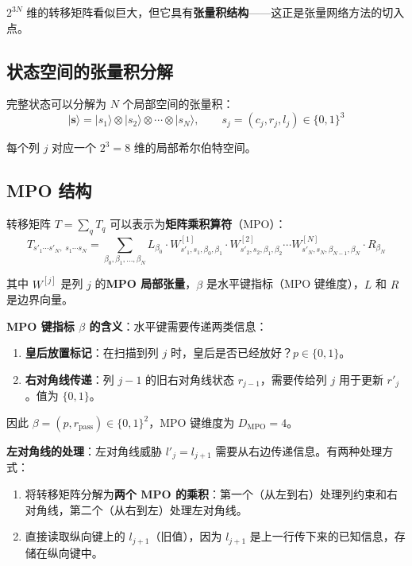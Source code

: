 \documentclass[12pt,a4paper]{ctexart}
\begin{document}
$2^{3N}$ 维的转移矩阵看似巨大，但它具有\textbf{张量积结构}——这正是张量网络方法的切入点。

\subsection{状态空间的张量积分解}

完整状态可以分解为 $N$ 个局部空间的张量积：
\begin{equation}
|\mathbf{s}\rangle = |s_1\rangle \otimes |s_2\rangle \otimes \cdots \otimes |s_N\rangle, \qquad s_j = (c_j, r_j, l_j) \in \{0,1\}^3
\end{equation}

每个列 $j$ 对应一个 $2^3 = 8$ 维的局部希尔伯特空间。

\subsection{MPO 结构}

转移矩阵 $T = \sum_q T_q$ 可以表示为\textbf{矩阵乘积算符}（MPO）：
\begin{equation}
T_{s'_1 \cdots s'_N,\; s_1 \cdots s_N} = \sum_{\beta_0, \beta_1, \ldots, \beta_N} L_{\beta_0} \cdot W^{[1]}_{s'_1, s_1, \beta_0, \beta_1} \cdot W^{[2]}_{s'_2, s_2, \beta_1, \beta_2} \cdots W^{[N]}_{s'_N, s_N, \beta_{N-1}, \beta_N} \cdot R_{\beta_N}
\end{equation}

其中 $W^{[j]}$ 是列 $j$ 的\textbf{MPO 局部张量}，$\beta$ 是水平键指标（MPO 键维度），$L$ 和 $R$ 是边界向量。

\textbf{MPO 键指标 $\beta$ 的含义}：水平键需要传递两类信息：
\begin{enumerate}
    \item \textbf{皇后放置标记}：在扫描到列 $j$ 时，皇后是否已经放好？$p \in \{0, 1\}$。
    \item \textbf{右对角线传递}：列 $j-1$ 的旧右对角线状态 $r_{j-1}$，需要传给列 $j$ 用于更新 $r'_j$。值为 $\{0, 1\}$。
\end{enumerate}

因此 $\beta = (p, r_{\text{pass}}) \in \{0,1\}^2$，MPO 键维度为 $D_{\text{MPO}} = 4$。

\textbf{左对角线的处理}：左对角线威胁 $l'_j = l_{j+1}$ 需要从右边传递信息。有两种处理方式：
\begin{enumerate}
    \item 将转移矩阵分解为\textbf{两个 MPO 的乘积}：第一个（从左到右）处理列约束和右对角线，第二个（从右到左）处理左对角线。
    \item 直接读取纵向键上的 $l_{j+1}$（旧值），因为 $l_{j+1}$ 是上一行传下来的已知信息，存储在纵向键中。
\end{enumerate}
\end{document}
